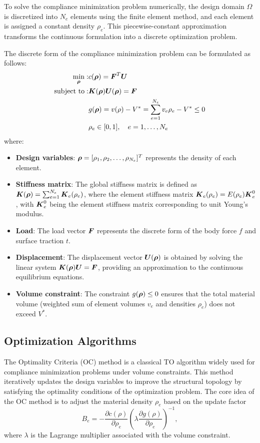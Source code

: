 \documentclass[mathpazo]{cicp}
\begin{document}
To solve the compliance minimization problem numerically, the design domain $\Omega$ is discretized into $N_e$ elements using the finite element method, and each element is assigned a constant density $\rho_e$. This piecewise-constant approximation transforms the continuous formulation into a discrete optimization problem.

The discrete form of the compliance minimization problem can be formulated as follows:
\begin{equation}\label{eq:cmpd}
	\begin{aligned} 
	\min_{\boldsymbol{\rho}}:&c(\boldsymbol{\rho}) = \boldsymbol{F}^T\boldsymbol{U} \\ 
	\text{subject~to}:&\boldsymbol{K}(\boldsymbol{\rho})\boldsymbol{U}(\boldsymbol{\rho}) = \boldsymbol{F}\\
					&g(\boldsymbol{\rho}) = v(\rho) - V^* = \sum_{e=1}^{N_e} v_e\rho_e - V^*\leq0 \\ 
					&\rho_e\in[0,1],\quad e=1,\ldots,N_e 
	\end{aligned}
\end{equation}
where: 
\begin{itemize} 
	\item \textbf{Design variables}: $\boldsymbol{\rho} = [\rho_1, \rho_2, \dots, \rho_{N_e}]^T$ represents the density of each element. 
	\item \textbf{Stiffness matrix}: The global stiffness matrix is defined as $\boldsymbol{K}(\boldsymbol{\rho}) = \sum_{e=1}^{N_e}\boldsymbol{K}_e(\rho_e)$, where the element stiffness matrix $\boldsymbol{K}_e(\rho_e) = E(\rho_e)\boldsymbol{K}_e^0$, with $\boldsymbol{K}_e^0$ being the element stiffness matrix corresponding to unit Young's modulus.
	 \item \textbf{Load}: The load vector $\boldsymbol{F}$ represents the discrete form of the body force $f$ and surface traction $t$. 
	\item \textbf{Displacement}: The displacement vector $\boldsymbol{U}(\boldsymbol{\rho})$ is obtained by solving the linear system $\boldsymbol{K}(\boldsymbol{\rho})\boldsymbol{U} = \boldsymbol{F}$, providing an approximation to the continuous equilibrium equations. 
	\item \textbf{Volume constraint}: The constraint $g(\boldsymbol{\rho})\leq0$ ensures that the total material volume (weighted sum of element volumes $v_e$ and densities $\rho_e$) does not exceed $V^*$. 
\end{itemize}

\subsection{Optimization Algorithms}
The Optimality Criteria (OC) method is a classical TO algorithm widely used for compliance minimization problems under volume constraints. This method iteratively updates the design variables to improve the structural topology by satisfying the optimality conditions of the optimization problem. The core idea of the OC method is to adjust the material density $\rho_e$ based on the update factor
\begin{equation*}
	B_e = -\frac{\partial{c}(\rho)}{\partial\rho_e}\left(\lambda\frac{\partial{g}(\rho)}{\partial\rho_e}\right)^{-1},
\end{equation*}
where $\lambda$ is the Lagrange multiplier associated with the volume constraint.
 
\end{document}
